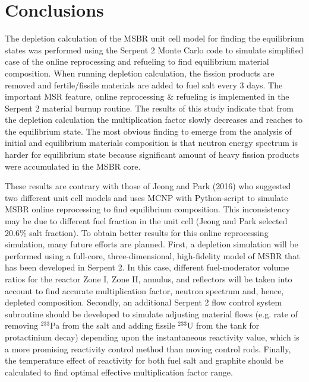 \documentclass{anstrans}
\begin{document}
\section{Conclusions}
The depletion calculation of the \gls{MSBR} unit cell model for finding the 
equilibrium states was performed using the Serpent 2 Monte Carlo code to 
simulate simplified case of the online reprocessing and refueling to find 
equilibrium material composition. When running depletion calculation, the 
fission products are removed and fertile/fissile materials are added to fuel 
salt every 3 days. The important MSR feature, online reprocessing \& refueling 
is implemented in the Serpent 2 material burnup routine. The results of this 
study indicate that from the depletion calculation the multiplication factor 
slowly decreases and reaches to the equilibrium state. The most obvious finding 
to emerge from the analysis of initial and equilibrium materials composition is 
that neutron energy spectrum is harder for equilibrium state because 
significant amount of heavy fission products were accumulated in the \gls{MSBR} 
core.

These results are contrary with those of Jeong and Park (2016) who suggested 
two different unit cell models and uses \gls{MCNP} with Python-script to 
simulate \gls{MSBR} online reprocessing to find equilibrium composition. This 
inconsistency may be due to different fuel fraction in the unit cell (Jeong and 
Park selected 20.6\% salt fraction). To obtain better results for this online 
reprocessing simulation, many future efforts are planned. First, a depletion 
simulation will be performed using a  full-core, three-dimensional, high-fidelity 
model of \gls{MSBR} that has been developed in Serpent 2. In this case, different 
fuel-moderator volume ratios for the reactor Zone I, Zone II, annulus, 
and reflectors will be taken into account to find accurate multiplication factor, 
neutron spectrum and, hence, depleted composition. Secondly, an additional Serpent 
2 flow control system subroutine should be developed to simulate adjusting 
material flows (e.g. rate of removing $^{233}$Pa from the salt and adding 
fissile $^{233}$U from the tank for protactinium decay) depending upon the 
instantaneous reactivity value, which is a more promising reactivity control method than moving 
control rods. Finally, the temperature effect of reactivity for both 
fuel salt and graphite should be calculated to find optimal effective 
multiplication factor range. 



\end{document}
